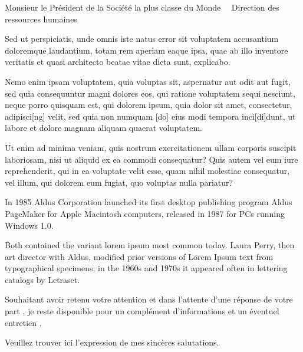 \documentclass{scrlttr2}
\renewcommand{\\}{~{\large\textperiodcentered}~}%
\begin{document}
\begin{letter}{ %
Monsieur le Président de
la Société la plus classe du Monde\\
Direction des ressources humaines\\

}
Sed ut perspiciatis, unde omnis iste natus error sit voluptatem accusantium doloremque laudantium, totam rem aperiam eaque ipsa, quae ab illo inventore veritatis et quasi architecto beatae vitae dicta sunt, explicabo.\\

Nemo enim ipsam voluptatem, quia voluptas sit, aspernatur aut odit aut fugit, sed quia consequuntur magni dolores eos, qui ratione voluptatem sequi nesciunt, neque porro quisquam est, qui dolorem ipsum, quia dolor sit amet, consectetur, adipisci[ng] velit, sed quia non numquam [do] eius modi tempora inci[di]dunt, ut labore et dolore magnam aliquam quaerat voluptatem.\\

Ut enim ad minima veniam, quis nostrum exercitationem ullam corporis suscipit laboriosam, nisi ut aliquid ex ea commodi consequatur? Quis autem vel eum iure reprehenderit, qui in ea voluptate velit esse, quam nihil molestiae consequatur, vel illum, qui dolorem eum fugiat, quo voluptas nulla pariatur?\\

In 1985 Aldus Corporation launched its first desktop publishing program Aldus PageMaker for Apple Macintosh computers, released in 1987 for PCs running Windows 1.0. \\

Both contained the variant lorem ipsum most common today. Laura Perry, then art director with Aldus, modified prior versions of Lorem Ipsum text from typographical specimens; in the 1960s and 1970s it appeared often in lettering catalogs by Letraset. \\


Souhaitant avoir retenu votre attention et dans l'attente d'une réponse de votre part , je reste disponible pour un complément d'informations et un éventuel entretien .

Veuillez trouver ici l'expression de mes sincères salutations.

\closing{}
\end{letter}
\end{document}

